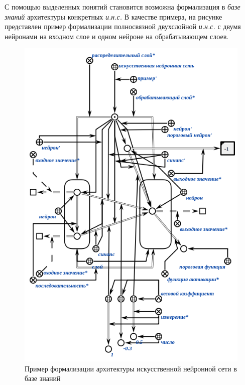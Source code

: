 \begin{SCn}
\end{SCn}

\begin{SCn}
\end{SCn}

С помощью выделенных понятий становится возможна формализация в \textit{базе знаний} архитектуры конкретных \textit{и.н.с.} В качестве примера, на рисунке \textit{} представлен пример формализации полносвязной двухслойной \textit{и.н.с.} с двумя нейронами на входном слое и одном нейроне на обрабатывающем слоев.

\begin{figure}
	\centering
	\includegraphics[width=0.8\linewidth]{author/part3/figures/neural_network_scg.png}
	\caption{Пример формализации архитектуры искусственной нейронной сети в базе знаний}
	\label{fig:neural_network_scg}
\end{figure}

